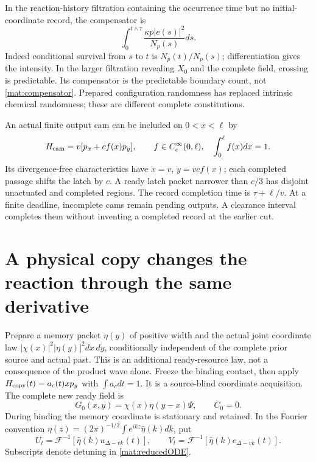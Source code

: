 \documentclass[11pt,oneside,openany]{book}
\theoremstyle{definition}
\theoremstyle{remark}\newtheorem{remark}[theorem]{Remark}
\begin{document}
In the reaction-history filtration containing the occurrence time but no initial-coordinate record, the compensator is
\begin{equation}
 \int_0^{t\wedge\tau}\frac{\kappa p|e(s)|^2}{N_p(s)}ds.
 \label{mat:compensator}
\end{equation}
Indeed conditional survival from $s$ to $t$ is $N_p(t)/N_p(s)$; differentiation gives the intensity. In the larger filtration revealing $X_0$ and the complete field, crossing is predictable. Its compensator is the predictable boundary count, not \eqref{mat:compensator}. Prepared configuration randomness has replaced intrinsic chemical randomness; these are different complete constitutions.

An actual finite output cam can be included on $0<x<\ell$ by
\[
 H_{\rm cam}=v[p_x+c f(x)p_y],\qquad
 f\in C_c^\infty(0,\ell),\quad\int_0^\ell f(x)dx=1.
\]
Its divergence-free characteristics have $\dot x=v$, $\dot y=vcf(x)$; each completed passage shifts the latch by $c$. A ready latch packet narrower than $c/3$ has disjoint unactuated and completed regions. The record completion time is $\tau+\ell/v$. At a finite deadline, incomplete cams remain pending outputs. A clearance interval completes them without inventing a completed record at the earlier cut.

\section{A physical copy changes the reaction through the same derivative}

Prepare a memory packet $\eta(y)$ of positive width and the actual joint coordinate law $|\chi(x)|^2|\eta(y)|^2dx\,dy$, conditionally independent of the complete prior source and actual past. This is an additional ready-resource law, not a consequence of the product wave alone. Freeze the binding contact, then apply $H_{\rm copy}(t)=a_c(t)x p_y$ with $\int a_cdt=1$. It is a source-blind coordinate acquisition. The complete new ready field is
\begin{equation}
 G_0(x,y)=\chi(x)\eta(y-x)\Psi,\qquad C_0=0.
 \label{mat:copiedready}
\end{equation}
During binding the memory coordinate is stationary and retained. In the Fourier convention $\eta(z)=(2\pi)^{-1/2}\int e^{ikz}\widehat\eta(k)dk$, put
\begin{equation}
 U_t=\mathcal F^{-1}[\widehat\eta(k)u_{\Delta-vk}(t)],\qquad
 V_t=\mathcal F^{-1}[\widehat\eta(k)e_{\Delta-vk}(t)].
 \label{mat:copiedamplitudes}
\end{equation}
Subscripts denote detuning in \eqref{mat:reducedODE}.
\end{document}
